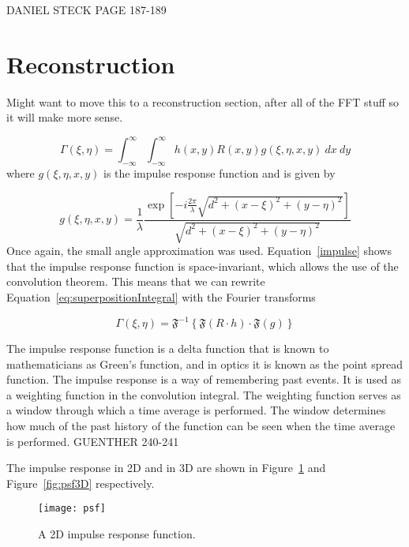             DANIEL STECK PAGE 187-189


    \section{Reconstruction}

    Might want to move this to a reconstruction section, after all of the FFT
    stuff so it will make more sense.

    \begin{equation}
        \Gamma(\xi,\eta) = \int_{-\infty}^{\infty}\int_{-\infty}^{\infty}
        h(x,y)R(x,y) g(\xi,\eta,x,y)~dx~dy
        \label{eq:superpositionIntegral}
    \end{equation}
    where $g(\xi,\eta,x,y)$ is the impulse response function and is given by

    \begin{equation}
        g(\xi,\eta,x,y)=\frac{1}{\lambda}\frac{\exp\left[
        -i\frac{2\pi}{\lambda}\sqrt{d^{2}+(x-\xi)^{2}+(y-\eta)^{2}} \right]}{\sqrt{d^{2}+(x-\xi)^{2}+(y-\eta)^{2}}}
        \label{impulse}
    \end{equation}
    Once again, the small angle approximation was used. Equation~\ref{impulse}
    shows that the impulse response function is space-invariant, which allows the
    use of the convolution theorem. This means that we can rewrite
    Equation~\ref{eq:superpositionIntegral} with the Fourier transforms

    \begin{equation}
        \Gamma(\xi,\eta) = \mathfrak{F}^{-1}\left\{ \mathfrak{F}(R\cdot h)
        \cdot\mathfrak{F}(g) \right\}
        \label{eq:convReconstruction}
    \end{equation}

    The impulse response function is a delta function that is known to mathematicians as Green's function,
    and in optics it is known as the point spread function. The impulse response is
    a way of remembering past events. It is used as a weighting function in the
    convolution integral. The weighting function serves as a window through which a
    time average is performed. The window determines how much of the past history
    of the function can be seen when the time average is performed.
    GUENTHER 240-241

    The impulse response in 2D and in 3D are shown in Figure~\ref{fig:psf} and
    Figure~\ref{fig:psf3D} respectively.

    \begin{figure}[htbp!]
        \begin{center}
            \texttt{[image: psf]}
        \end{center}
        \caption{A 2D impulse response function.}
        \label{fig:psf}
    \end{figure}

